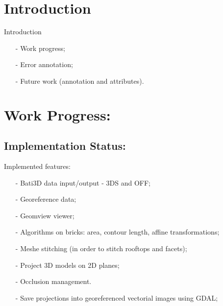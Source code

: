 \documentclass[9pt]{beamer}
\begin{document}
	\begin{frame}
		\tableofcontents
	\end{frame}



	\section*{Introduction}
	\begin{frame}{Introduction}
		\begin{itemize}
			\item[-] Work progress;
			\item[-] Error annotation;
			\item[-] Future work (annotation and attributes).
		\end{itemize}
	\end{frame}
	
		
	\section[Progress]{Work Progress:}

	\subsection[Implementation]{Implementation Status:}
	\begin{frame}{Implemented features:}
		\begin{itemize}
				\item[-] Bati3D data input/output - 3DS and OFF;
				\item[-] Georeference data;
				\item[-] Geomview viewer;
				\item[-] Algorithms on bricks: area, contour length, affine transformations;
				\item[-] Meshe stitching (in order to stitch rooftops and facets);
				\item[-] Project 3D models on 2D planes;
				\item[-] Occlusion management.
				\item[-] Save projections into georeferenced vectorial images using GDAL;

		\end{itemize}
	\end{frame}
\end{document}
